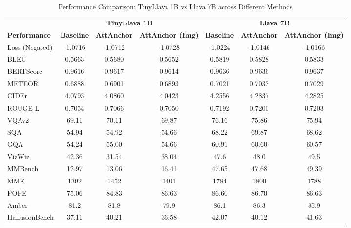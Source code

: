 \documentclass[11pt]{article}
\begin{document}
\vspace{-0.5cm}
\begin{table}[H]
\centering
\caption{Performance Comparison: TinyLlava 1B vs Llava 7B across Different Methods}
\scriptsize
\begin{tabular}{@{}l|ccc|ccc@{}}
\toprule
& \multicolumn{3}{c|}{\textbf{TinyLlava 1B}} & \multicolumn{3}{c}{\textbf{Llava 7B}} \\
\textbf{Performance} & \textbf{Baseline} & \textbf{AttAnchor} & \textbf{AttAnchor (Img)} & \textbf{Baseline} & \textbf{AttAnchor} & \textbf{AttAnchor (Img)} \\
\midrule
Loss (Negated) & -1.0716 & \textcolor{customgreen}{-1.0712} & -1.0728 & -1.0224 & \textcolor{customgreen}{-1.0146} & -1.0166 \\
BLEU & 0.5663 & \textcolor{customgreen}{0.5680} & 0.5652 & 0.5819 & 0.5828 & \textcolor{customgreen}{0.5833} \\
BERTScore & 0.9616 & \textcolor{customgreen}{0.9617} & 0.9614 & 0.9636 & 0.9636 & \textcolor{customgreen}{0.9637} \\
METEOR & 0.6888 & \textcolor{customgreen}{0.6901} & 0.6893 & 0.7021 & \textcolor{customgreen}{0.7033} & 0.7029 \\
CIDEr & 4.0793 & \textcolor{customgreen}{4.0860} & 4.0423 & 4.2556 & \textcolor{customgreen}{4.2837} & 4.2825 \\
ROUGE-L & 0.7054 & \textcolor{customgreen}{0.7066} & 0.7050 & 0.7192 & 0.7200 & \textcolor{customgreen}{0.7203} \\

VQAv2 & 69.11 & \textcolor{customgreen}{70.11} & 69.87 & \textcolor{customgreen}{76.16} & 75.86 & 75.94 \\
SQA & \textcolor{customgreen}{54.94} & 54.92 & 54.66 & 68.22 & \textcolor{customgreen}{69.87} & 68.62 \\
GQA & 54.24 & \textcolor{customgreen}{55.00} & 54.66 & \textcolor{customgreen}{60.91} & 60.60 & 60.57 \\
VizWiz & \textcolor{customgreen}{42.36} & 31.54 & 38.04 & 47.6 & 48.0 & \textcolor{customgreen}{49.5} \\

MMBench & 12.97 & 13.06 & \textcolor{customgreen}{16.41} & 47.65 & 47.68 & \textcolor{customgreen}{49.39} \\
MME & 1392 & \textcolor{customgreen}{1452} & 1401 & 1784 & \textcolor{customgreen}{1800} & 1788 \\

POPE & 75.06 & 84.83 & \textcolor{customgreen}{86.63} & 86.60 & \textcolor{customgreen}{86.70} & 86.63 \\
Amber & 81.2 & \textcolor{customgreen}{81.8} & 79.9 & 86.1 & \textcolor{customgreen}{86.3} & 85.9 \\
HallusionBench & 37.11 & \textcolor{customgreen}{40.21} & 36.58 & \textcolor{customgreen}{42.07} & 40.12 & 41.63 \\


\bottomrule
\end{tabular}
\label{tab:model_comparison}
\end{table}
\vspace{-0.7cm}
\end{document}
